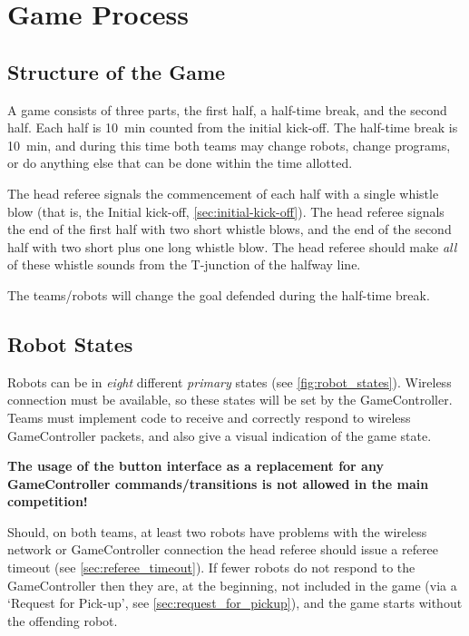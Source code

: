 \section{Game Process}
\label{sec:game_process}

\subsection{Structure of the Game}
\label{sec:game_struct}

A game consists of three parts, the first half, a half-time break, and the second half. Each half is \qty{10}{\minute} counted from the initial kick-off.
The half-time break is \qty{10}{\minute}, and during this time both teams may change robots, change programs, or do anything else that can be done within the time allotted.

The head referee signals the commencement of each half with a single whistle blow (that is, the Initial kick-off, \cf \cref{sec:initial-kick-off}).
The head referee signals the end of the first half with two short whistle blows, and the end of the second half with two short plus one long whistle blow.
The head referee should make \textit{all} of these whistle sounds from the T-junction of the halfway line.

The teams/robots will change the goal defended during the half-time break.

\subsection{Robot States}
\label{sec:robot_states}

Robots can be in \textit{eight} different \emph{primary} states (see \cref{fig:robot_states}). Wireless connection must be available, so these states will be set by the GameController. Teams must implement code to receive and correctly respond to wireless GameController packets, and also give a visual indication of the game state.

\textbf{The usage of the button interface as a replacement for any GameController commands/transitions is not allowed in the main competition!}

Should, on both teams, at least two robots have problems with the wireless network or GameController connection the head referee should issue a referee timeout (see \cref{sec:referee_timeout}).
If fewer robots do not respond to the GameController then they are, at the beginning, not included in the game (via a `Request for Pick-up', see \cref{sec:request_for_pickup}), and the game starts without the offending robot.

